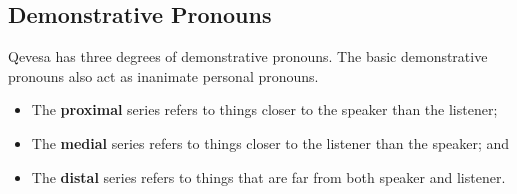 \documentclass[grammar]{subfiles}
\begin{document}



\subsection{Demonstrative Pronouns}
\label{ssec:nm_demonstrative_pronouns}

Qevesa has three degrees of demonstrative pronouns.  The basic demonstrative pronouns also act as inanimate personal pronouns.

\begin{itemize}
  \item The \textbf{proximal} series refers to things closer to the speaker than the listener;
  \item The \textbf{medial} series refers to things closer to the listener than the speaker; and
  \item The \textbf{distal} series refers to things that are far from both speaker and listener.
\end{itemize}
\end{document}
